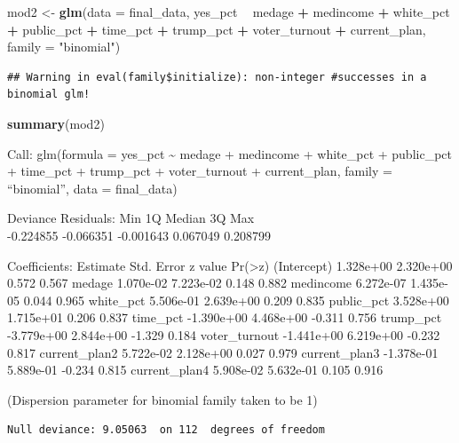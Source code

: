 \documentclass[
]{article}
\newenvironment{Shaded}{\begin{snugshade}}{\end{snugshade}}
\newcommand{\DataTypeTok}[1]{\textcolor[rgb]{0.13,0.29,0.53}{#1}}
\newcommand{\KeywordTok}[1]{\textcolor[rgb]{0.13,0.29,0.53}{\textbf{#1}}}
\newcommand{\NormalTok}[1]{#1}
\newcommand{\OperatorTok}[1]{\textcolor[rgb]{0.81,0.36,0.00}{\textbf{#1}}}
\newcommand{\StringTok}[1]{\textcolor[rgb]{0.31,0.60,0.02}{#1}}
\begin{document}
\begin{Shaded}
\begin{Highlighting}[]
\NormalTok{mod2 <-}\StringTok{ }\KeywordTok{glm}\NormalTok{(}\DataTypeTok{data =}\NormalTok{ final_data, yes_pct }\OperatorTok{~}\StringTok{ }\NormalTok{medage }\OperatorTok{+}\StringTok{ }\NormalTok{medincome }\OperatorTok{+}\StringTok{ }\NormalTok{white_pct }\OperatorTok{+}\StringTok{ }\NormalTok{public_pct }\OperatorTok{+}\StringTok{ }\NormalTok{time_pct }\OperatorTok{+}\StringTok{ }\NormalTok{trump_pct }\OperatorTok{+}\StringTok{ }\NormalTok{voter_turnout }\OperatorTok{+}\StringTok{ }\NormalTok{current_plan, }\DataTypeTok{family =} \StringTok{"binomial"}\NormalTok{)}
\end{Highlighting}
\end{Shaded}

\begin{verbatim}
## Warning in eval(family$initialize): non-integer #successes in a binomial glm!
\end{verbatim}

\begin{Shaded}
\begin{Highlighting}[]
\KeywordTok{summary}\NormalTok{(mod2)}
\end{Highlighting}
\end{Shaded}

Call: glm(formula = yes\_pct \textasciitilde{} medage + medincome +
white\_pct + public\_pct + time\_pct + trump\_pct + voter\_turnout +
current\_plan, family = ``binomial'', data = final\_data)

Deviance Residuals: Min 1Q Median 3Q Max\\
-0.224855 -0.066351 -0.001643 0.067049 0.208799

Coefficients: Estimate Std. Error z value
Pr(\textgreater\textbar z\textbar) (Intercept) 1.328e+00 2.320e+00 0.572
0.567 medage 1.070e-02 7.223e-02 0.148 0.882 medincome 6.272e-07
1.435e-05 0.044 0.965 white\_pct 5.506e-01 2.639e+00 0.209 0.835
public\_pct 3.528e+00 1.715e+01 0.206 0.837 time\_pct -1.390e+00
4.468e+00 -0.311 0.756 trump\_pct -3.779e+00 2.844e+00 -1.329 0.184
voter\_turnout -1.441e+00 6.219e+00 -0.232 0.817 current\_plan2
5.722e-02 2.128e+00 0.027 0.979 current\_plan3 -1.378e-01 5.889e-01
-0.234 0.815 current\_plan4 5.908e-02 5.632e-01 0.105 0.916

(Dispersion parameter for binomial family taken to be 1)

\begin{verbatim}
Null deviance: 9.05063  on 112  degrees of freedom
\end{verbatim}
\end{document}
